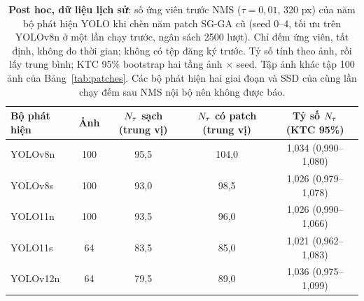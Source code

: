 \begin{table}[t]
\centering\small
\caption{\textbf{Post hoc, dữ liệu lịch sử}: số ứng viên trước NMS ($\tau=0{,}01$, 320 px) của năm bộ phát hiện YOLO khi chèn năm patch SG-GA cũ (seed 0--4, tối ưu trên YOLOv8n ở một lần chạy trước, ngân sách 2500 lượt). Chỉ đếm ứng viên, tất định, không đo thời gian; không có tệp đăng ký trước. Tỷ số tính theo ảnh, rồi lấy trung bình; KTC 95\% bootstrap hai tầng ảnh $\times$ seed. Tập ảnh khác tập 100 ảnh của Bảng~\ref{tab:patches}. Các bộ phát hiện hai giai đoạn và SSD của cùng lần chạy đếm sau NMS nội bộ nên không được báo.}
\label{tab:x2}
\begin{tabular}{@{}lcccc@{}}
\toprule
Bộ phát hiện & Ảnh & $N_{\tau}$ sạch (trung vị) & $N_{\tau}$ có patch (trung vị) & Tỷ số $N_{\tau}$ (KTC 95\%) \\
\midrule
YOLOv8n & 100 & 95,5 & 104,0 & 1,034 (0,990--1,080) \\
YOLOv8s & 100 & 93,0 & 98,5 & 1,026 (0,979--1,078) \\
YOLO11n & 100 & 93,5 & 96,0 & 1,026 (0,990--1,066) \\
YOLO11s & 64 & 83,5 & 85,0 & 1,021 (0,962--1,083) \\
YOLOv12n & 64 & 79,5 & 89,0 & 1,036 (0,975--1,099) \\
\bottomrule
\end{tabular}
\end{table}
